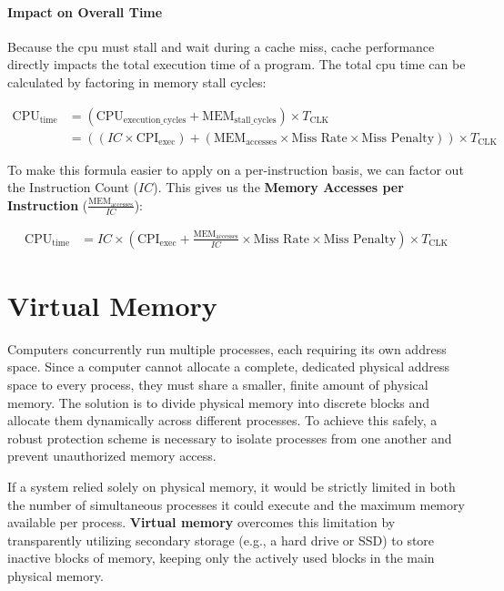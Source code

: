 \paragraph{Impact on Overall  Time}
Because the \gls{cpu} must stall and wait during a cache miss, cache performance directly impacts the total execution time of a program. The total \gls{cpu} time can be calculated by factoring in memory stall cycles:

\begin{align*}
    \text{CPU}_{\text{time}} &= (\text{CPU}_{\text{execution\_cycles}} + \text{MEM}_{\text{stall\_cycles}}) \times T_{\text{CLK}} \\
    &= \left( (IC \times \text{CPI}_{\text{exec}}) + (\text{MEM}_{\text{accesses}} \times \text{Miss Rate} \times \text{Miss Penalty}) \right) \times T_{\text{CLK}} 
\end{align*}

\noindent To make this formula easier to apply on a per-instruction basis, we can factor out the Instruction Count ($IC$). This gives us the \textbf{Memory Accesses per Instruction} ($\frac{\text{MEM}_{\text{accesses}}}{IC}$):

\begin{align*}
    \text{CPU}_{\text{time}} &= IC \times \left( \text{CPI}_{\text{exec}} + \frac{\text{MEM}_{\text{accesses}}}{IC} \times \text{Miss Rate} \times \text{Miss Penalty} \right) \times T_{\text{CLK}}
\end{align*}

\section{Virtual Memory}

Computers concurrently run multiple processes, each requiring its own address space. Since a computer cannot allocate a complete, dedicated physical address space to every process, they must share a smaller, finite amount of physical memory. The solution is to divide physical memory into discrete blocks and allocate them dynamically across different processes. To achieve this safely, a robust protection scheme is necessary to isolate processes from one another and prevent unauthorized memory access.

If a system relied solely on physical memory, it would be strictly limited in both the number of simultaneous processes it could execute and the maximum memory available per process. \textbf{Virtual memory} overcomes this limitation by transparently utilizing secondary storage (e.g., a hard drive or SSD) to store inactive blocks of memory, keeping only the actively used blocks in the main physical memory.

